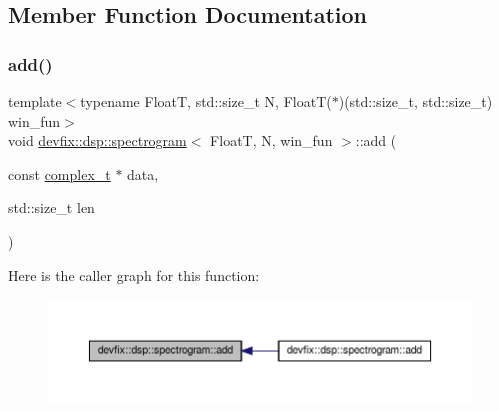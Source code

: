 \subsection{Member Function Documentation}
\mbox{\label{structdevfix_1_1dsp_1_1spectrogram_a9204dfb17067382f9e01295bc349d4f1}} 
\subsubsection{\texorpdfstring{add()}{add()}\hspace{0.1cm}{\footnotesize\ttfamily [1/3]}}
{\footnotesize\ttfamily template$<$typename FloatT, std\+::size\+\_\+t N, Float\+T($\ast$)(std\+::size\+\_\+t, std\+::size\+\_\+t) win\+\_\+fun$>$ \\
void \hyperlink{structdevfix_1_1dsp_1_1spectrogram}{devfix\+::dsp\+::spectrogram}$<$ FloatT, N, win\+\_\+fun $>$\+::add (\begin{DoxyParamCaption}\item[{const \hyperlink{structdevfix_1_1dsp_1_1spectrogram_a920fdda446509cfe81fa287773c709cb}{complex\+\_\+t} $\ast$}]{data,  }\item[{std\+::size\+\_\+t}]{len }\end{DoxyParamCaption})\hspace{0.3cm}{\ttfamily [inline]}}

Here is the caller graph for this function\+:\nopagebreak
\begin{figure}[H]
\begin{center}
\leavevmode
\includegraphics[width=350pt]{structdevfix_1_1dsp_1_1spectrogram_a9204dfb17067382f9e01295bc349d4f1_icgraph}
\end{center}
\end{figure}
\mbox{\label{structdevfix_1_1dsp_1_1spectrogram_abf5e5730f6248014f7ee5a22a0e96662}} 
